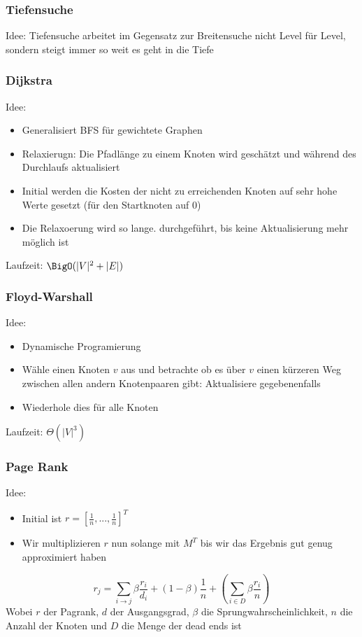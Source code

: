 	\subsubsection{Tiefensuche}
		Idee: Tiefensuche arbeitet im Gegensatz zur Breitensuche nicht Level für Level, sondern steigt immer so weit es geht in die Tiefe
	\subsubsection{Dijkstra}
		Idee:
		\begin{itemize}
		  \item Generalisiert BFS für gewichtete Graphen
		  \item Relaxierugn: Die Pfadlänge zu einem Knoten wird geschätzt und während des Durchlaufs aktualisiert 
		  \item Initial werden die Kosten der nicht zu erreichenden Knoten auf sehr hohe Werte gesetzt (für den Startknoten auf 0) 
		  \item Die Relaxoerung wird so lange. durchgeführt, bis keine Aktualisierung mehr möglich ist
		\end{itemize}
		Laufzeit: $\BigO(|V|^2+|E|)$
	\subsubsection{Floyd-Warshall}
		Idee:
		\begin{itemize}
		  \item Dynamische Programierung
		  \item Wähle einen Knoten $v$ aus und betrachte ob es über $v$ einen kürzeren Weg zwischen allen andern Knotenpaaren gibt: Aktualisiere gegebenenfalls 
		  \item Wiederhole dies für alle Knoten
		\end{itemize}
		Laufzeit: $\Theta(|V|^3)$
	\subsubsection{Page Rank}
	Idee: 
	\begin{itemize}
	  \item Initial ist $r=[\frac{1}{n},...,\frac{1}{n}]^T$
	  \item Wir multiplizieren $r$ nun solange mit $M^T$ bis wir das Ergebnis gut genug approximiert haben
	\end{itemize}
	$$
		r_j=\displaystyle\sum_{i\to j}\beta\frac{r_i}{d_i}+(1-\beta)\frac{1}{n}+(\displaystyle\sum_{i\in D}\beta\frac{r_i}{n})
	$$
	Wobei $r$ der Pagrank, $d$ der Ausgangsgrad, $\beta$ die Sprungwahrscheinlichkeit, $n$ die Anzahl der Knoten und $D$ die Menge der dead ends ist
